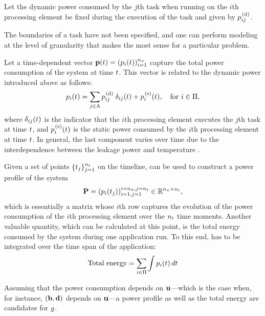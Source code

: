 Let the dynamic power consumed by the $j$th task when running on the $i$th
processing element be fixed during the execution of the task and given by
$p^{\text{\kern0.1em(d)}}_{ij}$.

\begin{remark}
The boundaries of a task have not been specified, and one can perform modeling
at the level of granularity that makes the most sense for a particular problem.
\end{remark}

Let a time-dependent vector $\mathbf{p}(t) = (p_i(t))_{i = 1}^{{n_\pi}}$ capture the
total power consumption of the system at time $t$. This vector is related to
the dynamic power introduced above as follows:
\begin{equation} \elab{power}
  \p_i(\t) = \sum_{j \in \tasks} \p^\dynamic_{ij} \: \delta_{ij} (\t) + \p^\static_i(\t), \hspace{1em} \text{for $i \in \procs$},
\end{equation}
where $\delta_{ij}(t)$ is the indicator that the $i$th processing element
executes the $j$th task at time $t$, and $p^{\text{\kern0.1em(s)}}_i(t)$ is the static power
consumed by the $i$th processing element at time $t$. In general, the last
component varies over time due to the interdependence between the leakage power
and temperature \cite{liu2007}.

Given a set of points $\{ t_j \}_{j = 1}^{n_t}$ on the timeline,  can
be used to construct a power profile of the system
\[
  \mathbf{P} = (p_i(t_j))_{i = 1, j = 1}^{i = {n_\pi}, j = {n_t}} \in \mathbb{R}^{{n_\pi} \times {n_t}},
\]
which is essentially a matrix whose $i$th row captures the evolution of the
power consumption of the $i$th processing element over the ${n_t}$ time moments.
Another valuable quantity, which can be calculated at this point, is the total
energy consumed by the system during one application run. To this end,
 has to be integrated over the time span of the application:
\begin{equation} \elab{total-energy}
  \text{Total energy} = \sum_{i \in \procs} \int \p_i(\t) \, d\t
\end{equation}

Assuming that the power consumption depends on $\mathbf{u}$---which is the case when,
for instance, $(\mathbf{b}, \mathbf{d})$ depends on $\mathbf{u}$---a power profile as well as the
total energy are candidates for $g$.
